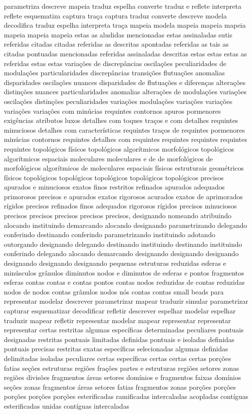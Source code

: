 parametriza descreve mapeia traduz espelha converte traduz e reflete interpreta reflete esquematiza captura traça captura traduz converte descreve modela decodifica traduz espelha interpreta traça mapeia modela mapeia mapeia mapeia mapeia mapeia mapeia estas as aludidas mencionadas estas assinaladas sutis referidas citadas citadas referidas as descritas apontadas referidas as tais as citadas pontuadas mencionadas referidas assinaladas descritas estas estas estas as referidas estas estas variações de discrepâncias oscilações peculiaridades de modulações particularidades discrepâncias transições flutuações anomalias disparidades oscilações nuances disparidades de flutuações e diferenças alterações distinções nuances particularidades anomalias alterações de modulações variações oscilações distinções peculiaridades variações modulações variações variações variações variações com minúcias requintes contornos apuros pormenores exigências atributos luxos detalhes com toques traços e com detalhes requintes minuciosos detalhes com características requintes traços de requintes pormenores minúcias contornos requintes detalhes com requintes requintes requintes requintes requintes topológicos físicos topológicos algorítmicos morfológicos topológicos algorítmicos espaciais moleculares moleculares e de de morfológicos de morfológicos algorítmicos de moleculares espaciais físicos estruturais geométricos físicos topológicos topológicos topológicos topológicos topológicos precisos apurados e minuciosos exatos finos restritos refinados apurados adequados primorosos precisos e apurados exatos rigorosos acurados exatos de aprimorados rígidos precisos refinados finos adequados rigorosos rígidos precisos minuciosos precisos precisos precisos precisos precisos, designando nomeando atribuindo alocando instituindo demarcando alocando designando parametrizando delegando conferindo destinando conferindo parametrizando instituindo adotando outorgando designando delegando destinando instituindo destinando instituindo conferindo delegando alocando demarcando designando designando designando designando designando designando pequenas estruturas reduzidas esferas e minúsculos grânulos diminutos nodos e diminutos de esferas e pontos fragmentos esferas contas contas e contas pontos contas nodos reduzidas de contas reduzidas nodos de nodos contas grânulos nodos nós contas contas small beads  para representar modelar descrever parametrizar mapear traduzir simular parametrizar capturar esquematizar decodificar refletir descrever espelhar modelar espelhar traduzir mapear refletir representar modelar mapear representar representar representar certas restritas algumas específicas determinadas peculiares pontuais designadas restritas pontuais limitadas definidas pontuais e isoladas definidas pontuais precisas restritas exatas específicas selecionadas algumas definidas delimitadas isoladas peculiares certas específicas certas certas certas porções fatias seções estruturas regiões frações partes e estruturas regiões setores zonas regiões divisões fragmentos áreas setores domínios e fragmentos faixas domínios seções zonas fragmentos áreas setores fatias fragmentos zonas porções porções porções porções porções esterificadas ramificadas intercaladas acopladas contíguas esterificadas unidas contíguas intercaladas 